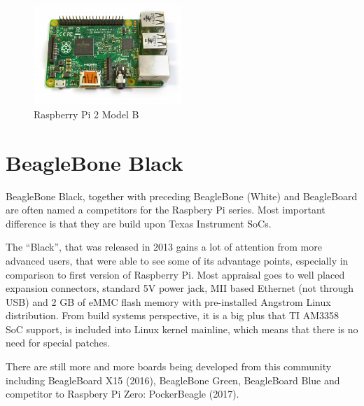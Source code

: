 \documentclass[printmode]{mgr}
\begin{document}
\begin{figure}[htbp]
  \centering
    \includegraphics[width=0.5\textwidth]{raspberrypi2-front.jpg}
  \caption{Raspberry Pi 2 Model B}
  \label{fig:devboard-raspberrypi2}
\end{figure}






\section{BeagleBone Black}

BeagleBone Black, together with preceding BeagleBone (White) and BeagleBoard are often named a competitors for the Raspbery Pi series.
Most important difference is that they are build upon Texas Instrument SoCs.

The ``Black'', that was released in 2013 gains a lot of attention from more advanced users, that were able to see some of its advantage points, especially in comparison to first version of Raspberry Pi.
Most appraisal goes to well placed expansion connectors, standard 5V power jack, MII based Ethernet (not through USB) and 2 GB of eMMC flash memory with pre-installed Angstrom Linux distribution.
From build systems perspective, it is a big plus that TI AM3358 SoC support, is included into Linux kernel mainline, which means that there is no need for special patches.

There are still more and more boards being developed from this community including BeagleBoard X15 (2016), BeagleBone Green, BeagleBoard Blue and competitor to Raspbery Pi Zero: PockerBeagle (2017).
\end{document}
